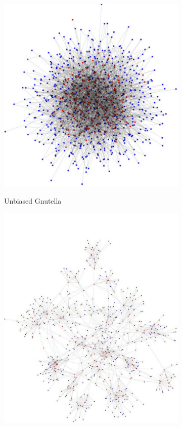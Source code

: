 \begin{figure}[tbp]
   \begin{subfigure}[]{0.4\linewidth}
     {\includegraphics[angle=-90,width=1\linewidth]{figures-pdf/snapshot_nond}}
   \caption{Unbiased Gnutella}%
   \end{subfigure}
\hfill
   \begin{subfigure}[]{0.45\linewidth}
     {\includegraphics[angle=-90,width=1\linewidth]{figures-pdf/snapshot_nd}}

\end{subfigure}
\end{figure}

